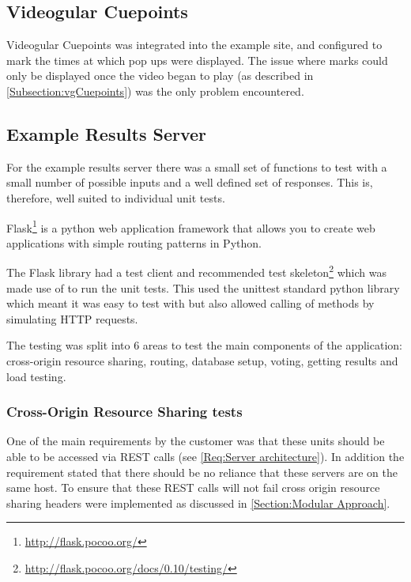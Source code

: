 \subsection{Videogular Cuepoints}
\label{Subsection:Videogular Cuepoints in example}
\gls{Videogular} Cuepoints was integrated into the example site, and configured to mark the times at which pop ups were displayed. The issue where marks could only be displayed once the video began to play (as described in \autoref{Subsection:vgCuepoints}) was the only problem encountered.

\subsection{Example Results Server}
\label{Subsection:Example Results Server in example}

For the example results server there was a small set of functions to test with a small number of possible inputs and a well defined set of responses. This is, therefore, well suited to individual unit tests.

Flask\footnote{\url{http://flask.pocoo.org/}} is a python web application framework that allows you to create web applications with simple routing patterns in Python.

The Flask library had a test client and recommended test skeleton\footnote{\url{http://flask.pocoo.org/docs/0.10/testing/}} which was made use of to run the unit tests. This used the unittest standard python library which meant it was easy to test with but also allowed calling of methods by simulating HTTP requests.

The testing was split into 6 areas to test the main components of the application: cross-origin resource sharing, routing, database setup, voting, getting results and load testing.

\subsubsection{Cross-Origin Resource Sharing tests}

One of the main requirements by the customer was that these units should be able to be accessed via \gls{REST} calls (see \cref{Req:Server architecture}). In addition the requirement stated that there should be no reliance that these servers are on the same host. To ensure that these \gls{REST} calls will not fail cross origin resource sharing headers were implemented as discussed in \autoref{Section:Modular Approach}.

